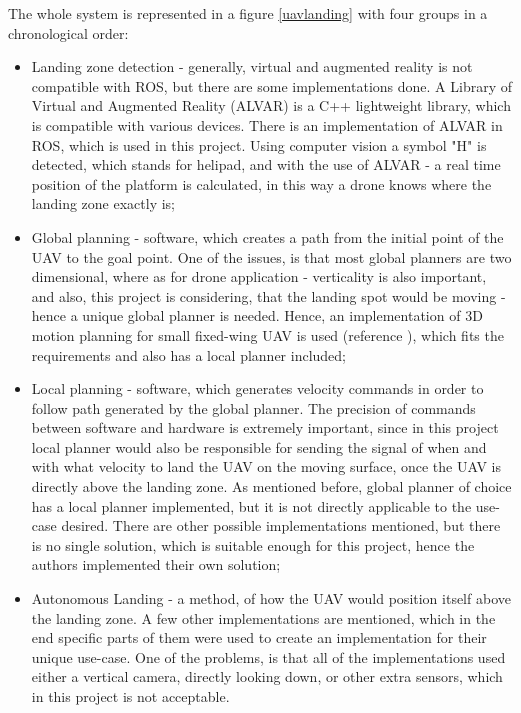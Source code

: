 \documentclass[11pt,a4paper,footinclude=true,headinclude=true, oneside]{scrbook}
\begin{document}
The whole system is represented in a figure \ref{uavlanding} with four groups in a chronological order: 
\begin{itemize}
    \item Landing zone detection - generally, virtual and augmented reality is not compatible with ROS, but there are some implementations done. A Library of Virtual and Augmented Reality (ALVAR) is a C++ lightweight library, which is compatible with various devices. There is an implementation of ALVAR in ROS, which is used in this project. Using computer vision a symbol "H" is detected, which stands for helipad, and with the use of ALVAR - a real time position of the platform is calculated, in this way a drone knows where the landing zone exactly is;
    \item Global planning - software, which creates a path from the initial point of the UAV to the goal point. One of the issues, is that most global planners are two dimensional, where as for drone application - verticality is also important, and also, this project is considering, that the landing spot would be moving - hence a unique global planner is needed. Hence, an implementation of 3D motion planning for small fixed-wing UAV is used (reference \cite{hwangbo_efficient_2007}), which fits the requirements and also has a local planner included;
    \item Local planning - software, which generates velocity commands in order to follow path generated by the global planner. The precision of commands between software and hardware is extremely important, since in this project local planner would also be responsible for sending the signal of when and with what velocity to land the UAV on the moving surface, once the UAV is directly above the landing zone. As mentioned before, global planner of choice has a local planner implemented, but it is not directly applicable to the use-case desired. There are other possible implementations mentioned, but there is no single solution, which is suitable enough for this project, hence the authors implemented their own solution;
    \item Autonomous Landing - a method, of how the UAV would position itself above the landing zone. A few other implementations are mentioned, which in the end specific parts of them were used to create an implementation for their unique use-case. One of the problems, is that all of the implementations used either a vertical camera, directly looking down, or other extra sensors, which in this project is not acceptable.
\end{itemize}
\end{document}
